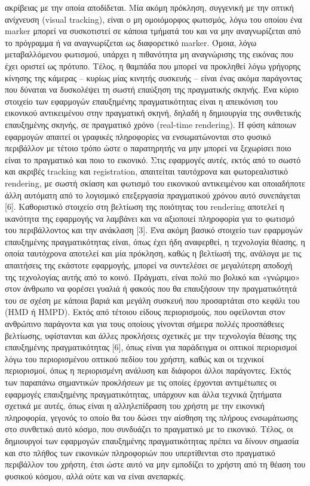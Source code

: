 ακρίβειας με την οποία αποδίδεται. Μία ακόμη πρόκληση, συγγενική με την οπτική ανίχνευση (visual tracking), είναι ο μη ομοιόμορφος φωτισμός, λόγω του οποίου ένα marker μπορεί να συσκοτιστεί σε κάποια τμήματά του και να μην αναγνωρίζεται από το πρόγραμμα ή να αναγνωρίζεται ως διαφορετικό marker. Όμοια, λόγω μεταβαλλόμενου φωτισμού, υπάρχει η πιθανότητα μη αναγνώρισης της εικόνας που έχει οριστεί ως πρότυπο. Τέλος, η θαμπάδα που μπορεί να προκληθεί λόγω γρήγορης κίνησης της κάμερας – κυρίως μίας κινητής συσκευής – είναι ένας ακόμα παράγοντας που δύναται να δυσκολέψει τη σωστή επαύξηση της πραγματικής σκηνής. Ένα κύριο στοιχείο των εφαρμογών επαυξημένης πραγματικότητας είναι η απεικόνιση του εικονικού αντικειμένου στην πραγματική σκηνή, δηλαδή η δημιουργία της συνθετικής επαυξημένης σκηνής, σε πραγματικό χρόνο (real-time rendering). Η φύση κάποιων εφαρμογών απαιτεί οι γραφικές πληροφορίες να ενσωματώνονται στο φυσικό περιβάλλον με τέτοιο τρόπο ώστε ο παρατηρητής να μην μπορεί να ξεχωρίσει ποιο είναι το πραγματικό και ποιο το εικονικό. Στις εφαρμογές αυτές, εκτός από το σωστό και ακριβές tracking και registration, απαιτείται ταυτόχρονα και φωτορεαλιστικό rendering, με σωστή σκίαση και φωτισμό του εικονικού αντικειμένου και οποιαδήποτε άλλη αυτόματη από το λογισμικό επεξεργασία πραγματικού χρόνου αυτό συνεπάγεται [6]. Καθοριστικό στοιχείο στη βελτίωση της ποιότητας του rendering αποτελεί η ικανότητα της εφαρμογής να λαμβάνει και να αξιοποιεί πληροφορία για το φωτισμό του περιβάλλοντος και την ανάκλαση [3]. Ένα ακόμη βασικό στοιχείο των εφαρμογών επαυξημένης πραγματικότητας είναι, όπως έχει ήδη αναφερθεί, η τεχνολογία θέασης, η οποία ταυτόχρονα αποτελεί και μία πρόκληση, καθώς η βελτίωσή της, ανάλογα με τις απαιτήσεις της εκάστοτε εφαρμογής, μπορεί να συντελέσει σε μεγαλύτερη αποδοχή της τεχνολογίας αυτής από το κοινό. Πράγματι, είναι πολύ πιο βολικό και «γνώριμο» στον άνθρωπο να φορέσει γυαλιά ή φακούς που θα επαυξήσουν την πραγματικότητά του σε σχέση με κάποια βαριά και μεγάλη συσκευή που προσαρτάται στο κεφάλι του (HMD ή HMPD). Εκτός από τέτοιου είδους περιορισμούς, που οφείλονται στον ανθρώπινο παράγοντα και για τους οποίους γίνονται σήμερα πολλές προσπάθειες βελτίωσης, υφίστανται και άλλες προκλήσεις σχετικές με την τεχνολογία θέασης της επαυξημένης πραγματικότητας [6], όπως είναι για παράδειγμα οι οπτικοί περιορισμοί λόγω του περιορισμένου οπτικού πεδίου του χρήστη, καθώς και οι τεχνικοί περιορισμοί, όπως η περιορισμένη ανάλυση και διάφοροι άλλοι παράγοντες. Εκτός των παραπάνω σημαντικών προκλήσεων με τις οποίες έρχονται αντιμέτωπες οι εφαρμογές επαυξημένης πραγματικότητας, υπάρχουν και άλλα τεχνικά ζητήματα σχετικά με αυτές, όπως είναι η αλληλεπίδραση του χρήστη με την εικονική πληροφορία, γεγονός το οποίο θα του δώσει την αίσθηση της πλήρους ενσωμάτωσης στο συνθετικό αυτό κόσμο, που συνδυάζει το πραγματικό με το εικονικό. Τέλος, οι δημιουργοί των εφαρμογών επαυξημένης πραγματικότητας πρέπει να δίνουν σημασία και στο πλήθος των εικονικών πληροφοριών που υπερτίθενται στο πραγματικό περιβάλλον του χρήστη, έτσι ώστε αυτό να μην εμποδίζει το χρήστη από τη θέαση του φυσικού κόσμου, αλλά ούτε και να είναι ανεπαρκές.
 



